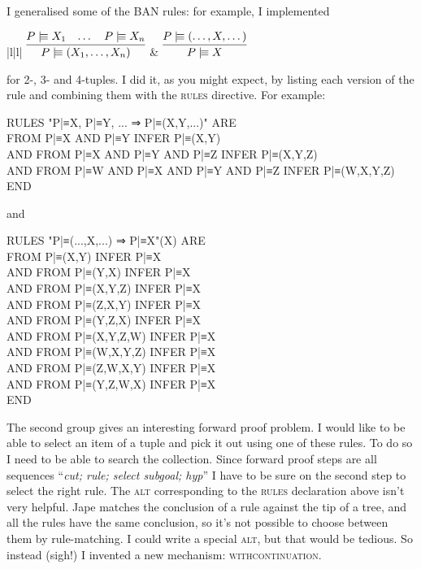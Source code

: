 I generalised some of the BAN rules: for example, I implemented
\begin{ruletab}{|l|l|} 
\hline
$\infer	{P \believes (X_{1},\dots,X_{n})}
		{P \believes X_{1}  & \dots & P \believes X_{n}}$ 
& 
$\infer	{P \believes X}
       	{P \believes (\dots,X,\dots) }$ 
\\
\hline 
\end{ruletab}
for 2-, 3- and 4-tuples. I did it, as you might expect, by listing each version of the rule and combining them with the \textsc{rules} directive. For example:

\begin{japeish}
RULES "P|≡X,  P|≡Y,  ... ⇒ P|≡(X,Y,...)" ARE \\
\tab \tab FROM P|≡X AND P|≡Y INFER P|≡(X,Y) \\
\tab AND    FROM P|≡X AND P|≡Y AND P|≡Z INFER P|≡(X,Y,Z) \\
\tab AND    FROM P|≡W AND P|≡X AND P|≡Y AND P|≡Z INFER P|≡(W,X,Y,Z) \\
END
\end{japeish}
and
\begin{japeish}
RULES "P|≡(...,X,...) ⇒ P|≡X"(X) ARE \\
\tab \tab FROM P|≡(X,Y) INFER P|≡X \\
\tab AND    FROM P|≡(Y,X) INFER P|≡X \\
\tab AND    FROM P|≡(X,Y,Z) INFER P|≡X \\
\tab AND    FROM P|≡(Z,X,Y) INFER P|≡X \\
\tab AND    FROM P|≡(Y,Z,X) INFER P|≡X \\
\tab AND    FROM P|≡(X,Y,Z,W) INFER P|≡X \\
\tab AND    FROM P|≡(W,X,Y,Z) INFER P|≡X \\
\tab AND    FROM P|≡(Z,W,X,Y) INFER P|≡X \\
\tab AND    FROM P|≡(Y,Z,W,X) INFER P|≡X \\
END
\end{japeish}

The second group gives an interesting forward proof problem. I would like to be able to select an item of a tuple and pick it out using one of these rules. To do so I need to be able to search the collection. Since forward proof steps are all sequences ``\textit{cut; rule; select subgoal; hyp}'' I have to be sure on the second step to select the right rule. The \textsc{alt} corresponding to the \textsc{rules} declaration above isn't very helpful. Jape matches the conclusion of a rule against the tip of a tree, and all the rules have the same conclusion, so it's not possible to choose between them by rule-matching. I could write a special \textsc{alt}, but that would be tedious. So instead (sigh!) I invented a new mechanism: \textsc{withcontinuation}.

